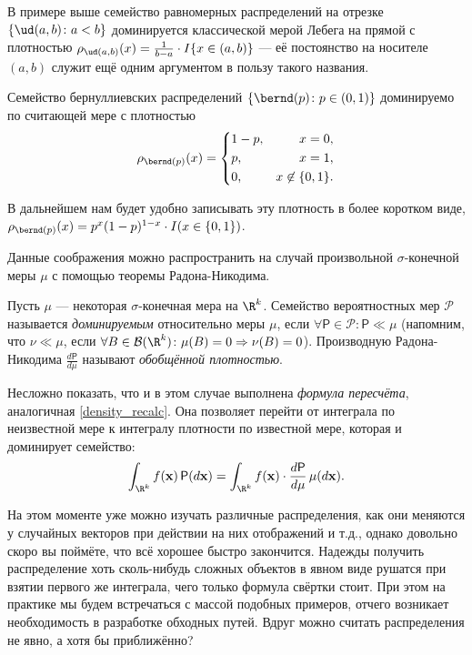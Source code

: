 \begin{example}
	В примере выше семейство равномерных распределений на отрезке $\{\ud(a, b)\colon a < b\}$ доминируется классической мерой Лебега на прямой с плотностью $\rho_{\ud(a, b)}(x) = \frac{1}{b-a} \cdot I\{x \in (a, b)\}$ --- её постоянство на носителе $(a, b)$ служит ещё одним аргументом в пользу такого названия. 
		
	Семейство бернуллиевских распределений $\{\bernd(p)\colon p \in (0, 1)\}$ доминируемо по считающей мере с плотностью
	\[
	\rho_{\bernd(p)}(x) = \left\{
		\begin{aligned}
			&1-p, & x = 0,\\
			&p,   & x = 1,\\
			&0,   & x \not\in \{0, 1\}.
		\end{aligned}
	\right.
	\]
	
	В дальнейшем нам будет удобно записывать эту плотность в более коротком виде, $\rho_{\bernd(p)}(x) = p^x (1-p)^{1-x} \cdot I(x \in \{0, 1\})$.
\end{example}

{
\footnotesize Данные соображения можно распространить на случай произвольной $\sigma$-конечной меры $\mu$ с помощью теоремы Радона-Никодима.

\begin{definition}
     Пусть $\mu$ --- некоторая $\sigma$-конечная мера на $\R^k$. Семейство вероятностных мер $\mathcal{P}$ называется \textit{доминируемым} относительно меры $\mu$, если $\forall \mathsf{P} \in \mathcal{P}\colon \mathsf{P} \ll \mu$ (напомним, что $\nu \ll \mu$, если $\forall B \in \mathcal{B}(\R^k)\colon \mu(B) = 0 \Rightarrow \nu(B) = 0$). Производную Радона-Никодима $\frac{d\mathsf{P}}{d\mu}$ называют \textit{обобщённой плотностью}.
\end{definition}

Несложно показать, что и в этом случае выполнена \textit{формула пересчёта}, аналогичная \eqref{density_recalc}. Она позволяет перейти от интеграла по неизвестной мере к интегралу плотности по известной мере, которая и доминирует семейство:
\[
\int_{\R^k} f(\mathbf{x})\,\mathsf{P}(d\mathbf{x}) = \int_{\R^k} f(\mathbf{x}) \cdot \frac{d\mathsf{P}}{d\mu}\,\mu(d\mathbf{x}).
\]
}

На этом моменте уже можно изучать различные распределения, как они меняются у случайных векторов при действии на них отображений и т.д., однако довольно скоро вы поймёте, что всё хорошее быстро закончится. Надежды получить распределение хоть сколь-нибудь сложных объектов в явном виде рушатся при взятии первого же интеграла, чего только формула свёртки стоит. При этом на практике мы будем встречаться с массой подобных примеров, отчего возникает необходимость в разработке обходных путей. Вдруг можно считать распределения не явно, а хотя бы приближённо?

